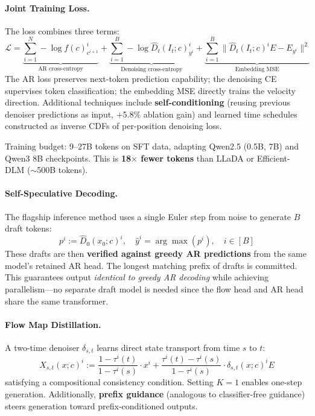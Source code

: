 \documentclass[11pt,a4paper]{article}
\begin{document}
\paragraph{Joint Training Loss.}
The loss combines three terms:
\begin{equation}
\mathcal{L} = \underbrace{\sum_{i=1}^{N} -\log f(c)^i_{c^{i+1}}}_{\text{AR cross-entropy}} + \underbrace{\sum_{i=1}^{B} -\log \hat{D}_t(I_t; c)^i_{y^i}}_{\text{Denoising cross-entropy}} + \underbrace{\sum_{i=1}^{B} \|\hat{D}_t(I_t; c)^i E - E_{y^i}\|^2}_{\text{Embedding MSE}}
\end{equation}
The AR loss preserves next-token prediction capability; the denoising CE supervises token classification; the embedding MSE directly trains the velocity direction. Additional techniques include \textbf{self-conditioning} (reusing previous denoiser predictions as input, $+$5.8\% ablation gain) and learned time schedules constructed as inverse CDFs of per-position denoising loss.

Training budget: 9--27B tokens on SFT data, adapting Qwen2.5 (0.5B, 7B) and Qwen3 8B checkpoints. This is \textbf{18$\times$ fewer tokens} than LLaDA or Efficient-DLM ($\sim$500B tokens).

\paragraph{Self-Speculative Decoding.}
The flagship inference method uses a single Euler step from noise to generate $B$ draft tokens:
\begin{equation}
p^i := \hat{D}_0(x_0; c)^i, \quad \hat{y}^i = \arg\max(p^i), \quad i \in [B]
\end{equation}
These drafts are then \textbf{verified against greedy AR predictions} from the same model's retained AR head. The longest matching prefix of drafts is committed. This guarantees output \emph{identical to greedy AR decoding} while achieving parallelism---no separate draft model is needed since the flow head and AR head share the same transformer.

\paragraph{Flow Map Distillation.}
A two-time denoiser $\delta_{s,t}$ learns direct state transport from time $s$ to $t$:
\begin{equation}
X_{s,t}(x; c)^i := \frac{1 - \tau^i(t)}{1 - \tau^i(s)} \cdot x^i + \frac{\tau^i(t) - \tau^i(s)}{1 - \tau^i(s)} \cdot \delta_{s,t}(x; c)^i E
\end{equation}
satisfying a compositional consistency condition. Setting $K{=}1$ enables one-step generation. Additionally, \textbf{prefix guidance} (analogous to classifier-free guidance) steers generation toward prefix-conditioned outputs.
\end{document}
